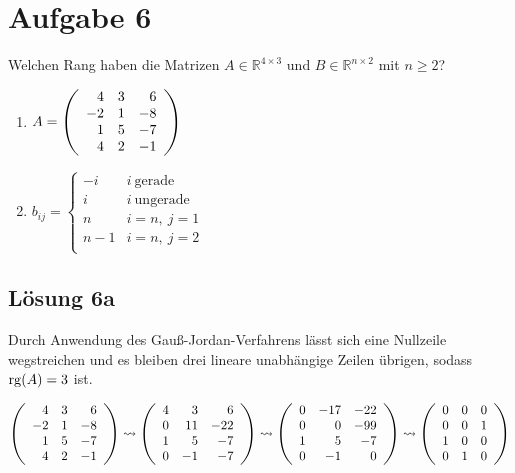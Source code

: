 \documentclass[main.tex]{subfiles}
\begin{document}
\section{Aufgabe 6}
Welchen Rang haben die Matrizen $A\in \mathbb{R}^{4\times 3}$ und $B\in \mathbb{R}^{n\times 2}$ mit $n\geq 2$?

\begin{enumerate}
    \item $A=\eqmatrix{rrr}{
        4 & 3 & 6 \\
        -2 & 1 & -8 \\
        1 & 5 & -7 \\
        4 & 2 & -1 \\
    }$ \\
    \item $b_{ij} = \begin{cases}
        -i & i\  \text{gerade} \\
         i & i\  \text{ungerade} \\
         n & i=n,\  j=1 \\
         n-1 & i=n,\  j=2 \\
    \end{cases}$
\end{enumerate}

\subsection{Lösung 6a}
Durch Anwendung des Gauß-Jordan-Verfahrens lässt sich eine Nullzeile wegstreichen und es bleiben drei lineare unabhängige Zeilen übrigen,
sodass $\rg(A) = 3$ ist.

\begin{align*}
    \eqmatrix{rrr}{
        4 & 3 & 6 \\
        -2 & 1 & -8 \\
        1 & 5 & -7 \\
        4 & 2 & -1 \\
    } \leadsto
    \eqmatrix{rrr}{
        4 & 3 & 6 \\
        0 & 11 & -22 \\
        1 & 5 & -7 \\
        0 & -1 & -7 \\
    } \leadsto
    \eqmatrix{rrr}{
        0 & -17 & -22 \\
        0 & 0 & -99 \\
        1 & 5 & -7 \\
        0 & -1 & 0 \\
    } \leadsto
    \eqmatrix{rrr}{
        0 & 0 & 0 \\
        0 & 0 & 1 \\
        1 & 0 & 0 \\
        0 & 1 & 0 \\
    }
\end{align*}
\end{document}
